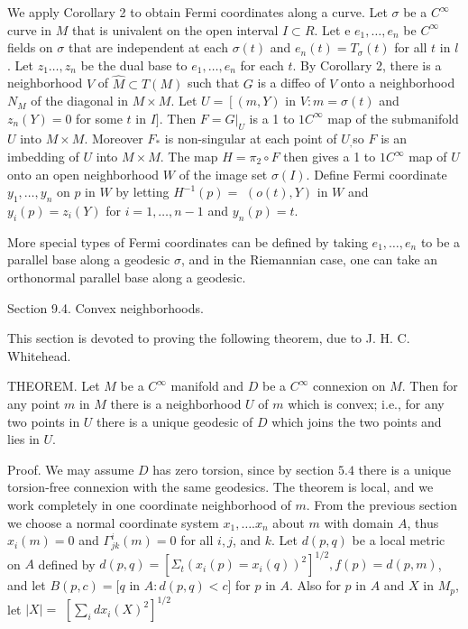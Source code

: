 \documentclass[10pt]{article}
\begin{document}
We apply Corollary 2 to obtain Fermi coordinates along a curve. Let $\sigma$ be a $C^{\infty}$ curve in $M$ that is univalent on the open interval $I \subset R .$ Let e $e_{1}, \ldots, e_{n}$ be $C^{\infty}$ fields on $\sigma$ that are independent at each $\sigma(t)$ and $e_{n}(t)=T_{\sigma}(t)$ for all $t$ in $l$. Let $z_{1} \ldots, z_{n}$ be the dual base to $e_{1}, \ldots, e_{n}$ for each $t .$ By Corollary 2, there is a neighborhood $V$ of $\hat{M} \subset T(M)$ such that $G$ is a diffeo of $V$ onto a neighborhood $N_{M}$ of the diagonal in $M \times M$. Let $U=\left[(m, Y)\right.$ in $V: m=\sigma(t)$ and $z_{n}(Y)=0$ for some $t$ in $I]$. Then $F=\left.G\right|_{U}$ is a 1 to $1 C^{\infty}$ map of the submanifold $U$ into $M \times M$. Moreover $F_{*}$ is non-singular at each point of $U_{,}$so $F$ is an imbedding of $U$ into $M \times M$. The map $H=\pi_{2} \circ F$ then gives a 1 to $1 C^{\infty}$ map of $U$ onto an open neighborhood $W$ of the image set $\sigma(I)$. Define Fermi coordinate $y_{1}, \ldots, y_{n}$ on $p$ in $W$ by letting $H^{-1}(p)=$ $(o(t), Y)$ in $W$ and $y_{i}(p)=z_{i}(Y)$ for $i=1, \ldots, n-1$ and $y_{n}(p)=t$.

More special types of Fermi coordinates can be defined by taking $e_{1}, \ldots, e_{n}$ to be a parallel base along a geodesic $\sigma$, and in the Riemannian case, one can take an orthonormal parallel base along a geodesic.

Section 9.4. Convex neighborhoods.

This section is devoted to proving the following theorem, due to J. H. C. Whitehead.

THEOREM. Let $M$ be a $C^{\infty}$ manifold and $D$ be a $C^{\infty}$ connexion on $M$. Then for any point $m$ in $M$ there is a neighborhood $U$ of $m$ which is convex; i.e., for any two points in $U$ there is a unique geodesic of $D$ which joins the two points and lies in $U$.

Proof. We may assume $D$ has zero torsion, since by section $5.4$ there is a unique torsion-free connexion with the same geodesics. The theorem is local, and we work completely in one coordinate neighborhood of $m$. From the previous section we choose a normal coordinate system $x_{1}, \ldots . x_{n}$ about $m$ with domain $A$, thus $x_{i}(m)=0$ and $\Gamma_{j k}^{i}(m)=0$ for all $i, j$, and $k$. Let $d(p, q)$ be a local metric on $A$ defined by $d(p, q)=\left[\Sigma_{t}\left(x_{i}(p)=x_{i}(q)\right)^{2}\right]^{1 / 2}, f(p)=d(p, m)$, and let $B(p, c)=[q$ in $A: d(p, q)<c]$ for $p$ in $A .$ Also for $p$ in $A$ and $X$ in $M_{p}$, let $|X|=$ $\left[\sum_{i} d x_{i}(X)^{2}\right]^{1 / 2}$
\end{document}
